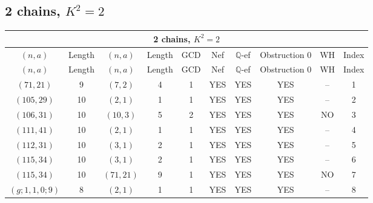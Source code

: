 \subsection{2 chains, \(K^2 = 2\)}
\begin{longtable}{|c|c|c|c|c|c|c|c|c|c|}
\hline
\multicolumn{10}{|c|}{2 chains, $K^2 = 2$}\\
\hline
$(n,a)$ & Length & $(n,a)$ & Length & GCD & Nef & $\mathbb Q$-ef & Obstruction 0 & WH & Index\\
\hline
\endfirsthead

\hline
$(n,a)$ & Length & $(n,a)$ & Length & GCD & Nef & $\mathbb Q$-ef & Obstruction 0 & WH & Index\\
\hline
\endhead
\hline
\endfoot

$(71, 21)$ & 9 & $(7, 2)$ & 4 & 1 & YES & YES & YES & -- & 1\\
$(105, 29)$ & 10 & $(2, 1)$ & 1 & 1 & YES & YES & YES & -- & 2\\
$(106, 31)$ & 10 & $(10, 3)$ & 5 & 2 & YES & YES & YES & NO & 3\\
$(111, 41)$ & 10 & $(2, 1)$ & 1 & 1 & YES & YES & YES & -- & 4\\
$(112, 31)$ & 10 & $(3, 1)$ & 2 & 1 & YES & YES & YES & -- & 5\\
$(115, 34)$ & 10 & $(3, 1)$ & 2 & 1 & YES & YES & YES & -- & 6\\
$(115, 34)$ & 10 & $(71, 21)$ & 9 & 1 & YES & YES & YES & NO & 7\\
$(g; 1, 1, 0; 9)$ & 8 & $(2, 1)$ & 1 & 1 & YES & YES & YES & -- & 8
\end{longtable}
